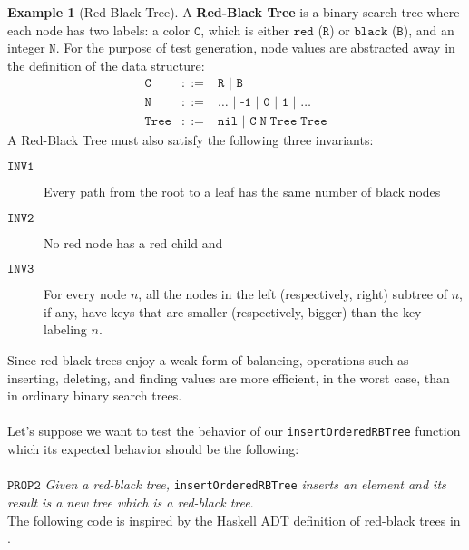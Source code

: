 \documentclass{report}
\theoremstyle{definition}
\newtheorem{example}{Example}[section]
\theoremstyle{definition}
\begin{document}
\begin{example}[Red-Black Tree]
	A \textbf{Red-Black Tree} is a binary search tree where each node has two labels: a color $\mathtt{C}$, which is either $\mathtt{red}$ ($\mathtt{R}$) or $\mathtt{black}$ ($\mathtt{B}$), and an integer $\mathtt{N}$. For the purpose of test generation, node values are abstracted away in the definition of the data structure:
	\begin{equation*}
		\begin{array}{rll}
			\mathtt{C}    & ::= & \mathtt{R} \texttt{ | } \mathtt{B}                        \\
			\mathtt{N}    & ::= & \ldots \texttt{ | -1 | 0 | 1 | } \ldots                   \\
			\mathtt{Tree} & ::= & \mathtt{nil} \texttt{ | } \mathtt{C \; N \; Tree \; Tree} 
		\end{array}
	\end{equation*}
	A Red-Black Tree must also satisfy the following three invariants:
	\begin{description}
		\item[$\mathtt{INV1}$] Every path from the root to a leaf has the same number of black nodes
		\item[$\mathtt{INV2}$] No red node has a red child and
		\item[$\mathtt{INV3}$] For every node $n$, all the nodes in the left (respectively, right) subtree of $n$, if
		any, have keys that are smaller (respectively, bigger) than the key labeling $n$.
	\end{description}
	Since red-black trees enjoy a weak form of balancing, operations such as inserting, deleting, and finding values are more efficient, in the worst case, than in ordinary binary search trees.\\\\
	Let's suppose we want to test the behavior of our \texttt{insertOrderedRBTree} function which its expected behavior should be the following:\\\\
	$\mathtt{PROP2}$ \textit{Given a red-black tree,} \texttt{insertOrderedRBTree} \textit{inserts an element and its result is a new tree which is a red-black tree}. \pagebreak \\
	The following code is inspired by the Haskell ADT definition of red-black trees in \cite{rbtreehaskell}.
	
	
	
	
\end{example}
\end{document}
